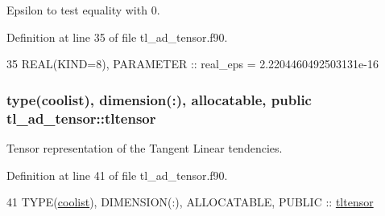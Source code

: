 Epsilon to test equality with 0. 



Definition at line 35 of file tl\+\_\+ad\+\_\+tensor.\+f90.


\begin{DoxyCode}
35   \textcolor{keywordtype}{REAL(KIND=8)}, \textcolor{keywordtype}{PARAMETER} :: real\_eps = 2.2204460492503131e-16
\end{DoxyCode}
\subsubsection[{\texorpdfstring{tltensor}{tltensor}}]{\setlength{\rightskip}{0pt plus 5cm}type({\bf coolist}), dimension(\+:), allocatable, public tl\+\_\+ad\+\_\+tensor\+::tltensor}\hypertarget{namespacetl__ad__tensor_a6180cfcc4d4ad119ef93266ea955903c}{}\label{namespacetl__ad__tensor_a6180cfcc4d4ad119ef93266ea955903c}


Tensor representation of the Tangent Linear tendencies. 



Definition at line 41 of file tl\+\_\+ad\+\_\+tensor.\+f90.


\begin{DoxyCode}
41   \textcolor{keywordtype}{TYPE}(\hyperlink{structtensor_1_1coolist}{coolist}), \textcolor{keywordtype}{DIMENSION(:)}, \textcolor{keywordtype}{ALLOCATABLE}, \textcolor{keywordtype}{PUBLIC} :: \hyperlink{namespacetl__ad__tensor_a6180cfcc4d4ad119ef93266ea955903c}{tltensor}
\end{DoxyCode}
